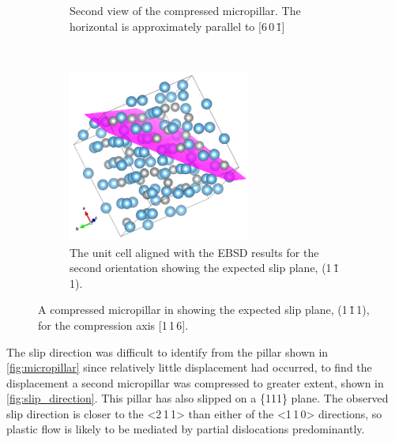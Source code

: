 \begin{figure}[!h]
\begin{subfigure}{0.45\textwidth}
\caption{Second view of the compressed  micropillar. The horizontal is approximately parallel to [6\,0\,\={1}]}
\end{subfigure}
~
\begin{subfigure}{0.45\textwidth}
\centering
\includegraphics[width=0.66\textwidth]{Pillar_3_unit_cell_v2}
\caption{The unit cell aligned with the EBSD results for the second orientation showing the expected slip plane, (1\,\={1}\,1).}
\end{subfigure}
\caption[A compressed micropillar of  showing the slip plane.]{A compressed micropillar in  showing the expected slip plane, (1\,\={1}\,1), for the compression axis [1\,1\,6].\label{fig:micropillar}}
\end{figure}

The slip direction was difficult to identify from the pillar shown in \autoref{fig:micropillar} since relatively little displacement had occurred, to find the displacement a second micropillar was compressed to greater extent, shown in \autoref{fig:slip_direction}. This pillar has also slipped on a \{111\} plane. The observed slip direction is closer to the <2\,1\,1> than either of the <1\,1\,0> directions, so plastic flow is likely to be mediated by partial dislocations predominantly.

